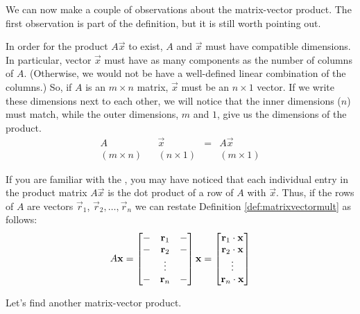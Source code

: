 \documentclass{ximera}
\begin{document}
We can now make a couple of observations about the matrix-vector product.  The first observation is part of the definition, but it is still worth pointing out.
\begin{observation}
In order for the product $A\vec{x}$ to exist, $A$ and $\vec{x}$ must have compatible dimensions.  In particular, vector $\vec{x}$ must have as many components as the number of columns of $A$.  (Otherwise, we would not be have a well-defined linear combination of the columns.)  So, if $A$ is an $m\times n$ matrix, $\vec{x}$ must be an $n\times 1$ vector.  If we write these dimensions next to each other, we will notice that the inner dimensions ($n$) must match, while the outer dimensions, $m$ and $1$, give us the dimensions of the product.
$$\begin{array}{ccccc}
A& & \vec{x} &=& A\vec{x}\\
(m\times n) & &(n\times 1) & &(m\times 1)
\end{array}$$
\end{observation}

\begin{observation} If you are familiar with the , you may have noticed that each individual entry in the product matrix $A\vec{x}$ is the dot product of a row of $A$ with $\vec{x}$.  Thus, if the rows of $A$ are vectors $\vec{r}_1$, $\vec{r}_2,\ldots ,\vec{r}_n$ we can restate Definition \ref{def:matrixvectormult} as follows:
$$A\mathbf{x}=\begin{bmatrix}-&\mathbf{r}_1&-\\-&\mathbf{r}_2&-\\ &\vdots & \\-&\mathbf{r}_n &-\end{bmatrix}\mathbf{x}=\begin{bmatrix}\mathbf{r}_1\cdot\mathbf{x}\\\mathbf{r}_2\cdot\mathbf{x}\\\vdots\\\mathbf{r}_n\cdot\mathbf{x}\end{bmatrix}$$
\end{observation}

Let's find another matrix-vector product.
\end{document}
